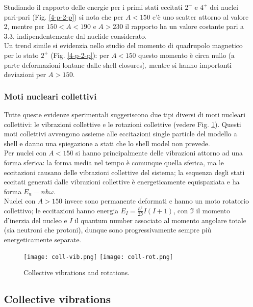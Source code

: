 Studiando il rapporto delle energie per i primi stati eccitati $ 2^+ $ e $ 4^+ $ dei nuclei pari-pari (Fig. \ref{4-p-2-p}) si nota che per $ A < 150 $ c'è uno scatter attorno al valore 2, mentre per $ 150 < A < 190 $ e $ A > 230 $ il rapporto ha un valore costante pari a 3.3, indipendentemente dal nuclide considerato.\\
Un trend simile si evidenzia nello studio del momento di quadrupolo magnetico per lo stato $ 2^+ $ (Fig. \ref{4-p-2-p}): per $ A < 150 $ questo momento è circa nullo (a parte deformazioni lontane dalle shell closures), mentre si hanno importanti deviazioni per $ A > 150 $.

\subsubsection{Moti nucleari collettivi}

Tutte queste evidenze sperimentali suggeriscono due tipi diversi di moti nucleari collettivi: le vibrazioni collettive e le rotazioni collettive (vedere Fig. \ref{coll}). Questi moti collettivi avvengono assieme alle eccitazioni single particle del modello a shell e danno una spiegazione a stati che lo shell model non prevede.\\
Per nuclei con $ A < 150 $ si hanno principalmente delle vibrazioni attorno ad una forma sferica: la forma media nel tempo è comunque quella sferica, ma le eccitazioni causano delle vibrazioni collettive del sistema; la sequenza degli stati eccitati generati dalle vibrazioni collettive è energeticamente equispaziata e ha forma $ E_n = n \hbar \omega $.\\
Nuclei con $ A > 150 $ invece sono permanente deformati e hanno un moto rotatorio collettivo; le eccitazioni hanno energia $ E_{I} = \frac{\hbar^2}{2\mathfrak{I}} I (I + 1) $, con $ \mathfrak{I} $ il momento d'inerzia del nucleo e $ I $ il quantum number associato al momento angolare totale (sia neutroni che protoni), dunque sono progressivamente sempre più energeticamente separate.

\begin{figure}[!t]
	\centering
	\texttt{[image: coll-vib.png]}
	\texttt{[image: coll-rot.png]}
	\caption{Collective vibrations and rotations.}
	\label{coll}
\end{figure}

\subsection{Collective vibrations}

